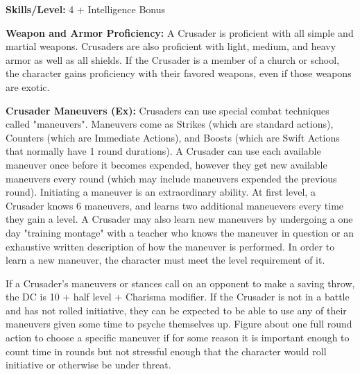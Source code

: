 \textbf{Skills/Level:} 4 + Intelligence Bonus

\goodbab{}
\goodfor{}
\goodref{}
\goodwil{}

\begin{extraclasstable}{}
\end{extraclasstable}

\classfeatures

\textbf{Weapon and Armor Proficiency:} A Crusader is proficient with all simple and martial weapons. Crusaders are also proficient with light, medium, and heavy armor as well as all shields. If the Crusader is a member of a church or school, the character gains proficiency with their favored weapons, even if those weapons are exotic.

\textbf{Crusader Maneuvers (Ex):} Crusaders can use special combat techniques called "maneuvers". Maneuvers come as Strikes (which are standard actions), Counters (which are Immediate Actions), and Boosts (which are Swift Actions that normally have 1 round durations). A Crusader can use each available maneuver once before it becomes expended, however they get new available maneuvers every round (which may include maneuvers expended the previous round). Initiating a maneuver is an extraordinary ability. At first level, a Crusader knows 6 maneuvers, and learns two additional maneuevers every time they gain a level. A Crusader may also learn new maneuvers by undergoing a one day "training montage" with a teacher who knows the maneuver in question or an exhaustive written description of how the maneuver is performed. In order to learn a new maneuver, the character must meet the level requirement of it.

If a Crusader's maneuvers or stances call on an opponent to make a saving throw, the DC is 10 + half level + Charisma modifier. If the Crusader is not in a battle and has not rolled initiative, they can be expected to be able to use any of their maneuvers given some time to psyche themselves up. Figure about one full round action to choose a specific maneuver if for some reason it is important enough to count time in rounds but not stressful enough that the character would roll initiative or otherwise be under threat.

